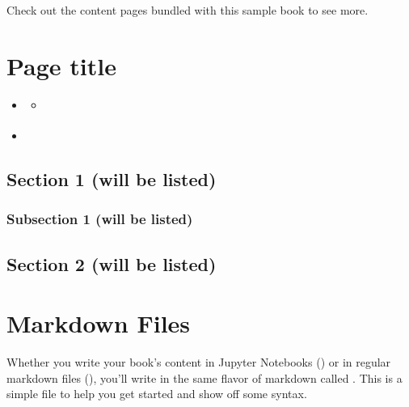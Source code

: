 \documentclass[letterpaper,10pt,english]{jupyterBook}
\begin{document}
\sphinxAtStartPar
Check out the content pages bundled with this sample book to see more.


\chapter{Page title}
\label{\detokenize{intro:page-title}}
\begin{sphinxShadowBox}
\begin{itemize}
\item {} 
\sphinxAtStartPar
{}\label{\detokenize{intro:id1}}{\hyperref[\detokenize{intro:section-1-will-be-listed}]{}}
\begin{itemize}
\item {} 
\sphinxAtStartPar
{}\label{\detokenize{intro:id2}}{\hyperref[\detokenize{intro:sub-section-1-will-be-listed}]{}}

\end{itemize}

\item {} 
\sphinxAtStartPar
{}\label{\detokenize{intro:id3}}{\hyperref[\detokenize{intro:section-2-will-be-listed}]{}}

\end{itemize}
\end{sphinxShadowBox}


\section{Section 1 (will be listed)}
\label{\detokenize{intro:section-1-will-be-listed}}

\subsection{Sub\sphinxhyphen{}section 1 (will be listed)}
\label{\detokenize{intro:sub-section-1-will-be-listed}}

\section{Section 2 (will be listed)}
\label{\detokenize{intro:section-2-will-be-listed}}
\sphinxstepscope


\chapter{Markdown Files}
\label{\detokenize{markdown:markdown-files}}\label{\detokenize{markdown::doc}}
\sphinxAtStartPar
Whether you write your book’s content in Jupyter Notebooks () or
in regular markdown files (), you’ll write in the same flavor of markdown
called .
This is a simple file to help you get started and show off some syntax.
\end{document}
